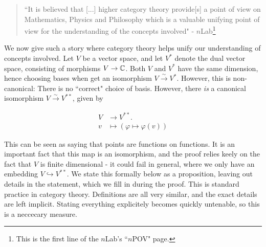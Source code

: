 \documentclass{article}
\theoremstyle{definition}
\numberwithin{figure}{section}
\begin{document}
\begin{quote}
``It is believed that [...] higher category theory provide[s] a point of view on Mathematics, Physics and Philosophy which is a valuable unifying point of view for the understanding of the concepts involved" - $n$Lab\footnote{This is the first line of the $n$Lab's ``$n$POV" page.}
\end{quote}

We now give such a story where category theory helps unify our understanding of concepts involved. Let $V$ be a vector space, and let $V^*$ denote the dual vector space, consisting of morphisms $V\to \mathbb{C}$. Both $V$ and $V^*$ have the same dimension, hence choosing bases when get an isomorphism $V\xrightarrow{\sim}V^*$. However, this is non-canonical: There is no ``correct" choice of basis. However, there \textit{is} a canonical isomorphism $V\xrightarrow{\sim}V^{**}$, given by

\begin{align*}
V&\xrightarrow{}V^{**}.\\
v&\mapsto (\varphi\mapsto \varphi(v))
\end{align*}

This can be seen as saying that points are functions on functions. It is an important fact that this map is an isomorphism, and the proof relies keely on the fact that $V$ is finite dimensional - it could fail in general, where we only have an embedding $V\hookrightarrow{} V^{**}$. We state this formally below as a proposition, leaving out details in the statement, which we fill in during the proof. This is standard practice in category theory. Definitions are all very similar, and the exact details are left implicit. Stating everything explicitely becomes quickly untenable, so this is a neccecary measure.
\end{document}
